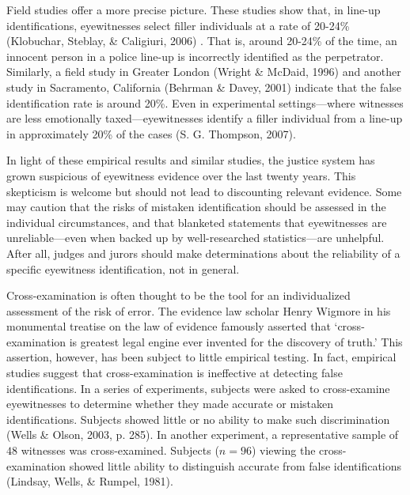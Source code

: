 \documentclass[
  10pt,
  dvipsnames,enabledeprecatedfontcommands]{scrartcl}
\begin{document}
Field studies offer a more precise picture. These studies show that, in
line-up identifications, eyewitnesses select filler individuals at a
rate of 20-24\% (Klobuchar, Steblay, \& Caligiuri, 2006) . That is,
around 20-24\% of the time, an innocent person in a police line-up is
incorrectly identified as the perpetrator. Similarly, a field study in
Greater London (Wright \& McDaid, 1996) and another study in Sacramento,
California (Behrman \& Davey, 2001) indicate that the false
identification rate is around 20\%. Even in experimental
settings---where witnesses are less emotionally taxed---eyewitnesses
identify a filler individual from a line-up in approximately 20\% of the
cases (S. G. Thompson, 2007).

In light of these empirical results and similar studies, the justice
system has grown suspicious of eyewitness evidence over the last twenty
years. This skepticism is welcome but should not lead to discounting
relevant evidence. Some may caution that the risks of mistaken
identification should be assessed in the individual circumstances, and
that blanketed statements that eyewitnesses are unreliable---even when
backed up by well-researched statistics---are unhelpful. After all,
judges and jurors should make determinations about the reliability of a
specific eyewitness identification, not in general.

Cross-examination is often thought to be the tool for an individualized
assessment of the risk of error. The evidence law scholar Henry Wigmore
in his monumental treatise on the law of evidence famously asserted that
`cross-examination is greatest legal engine ever invented for the
discovery of truth.' This assertion, however, has been subject to little
empirical testing.  In fact, empirical studies
suggest that cross-examination is ineffective at detecting false
identifications. In a series of experiments, subjects were asked to
cross-examine eyewitnesses to determine whether they made accurate or
mistaken identifications. Subjects showed little or no ability to make
such discrimination (Wells \& Olson, 2003, p. 285). In another
experiment, a representative sample of \(48\) witnesses was
cross-examined. Subjects (\(n = 96\)) viewing the cross-examination
showed little ability to distinguish accurate from false identifications
(Lindsay, Wells, \& Rumpel, 1981).
\end{document}
